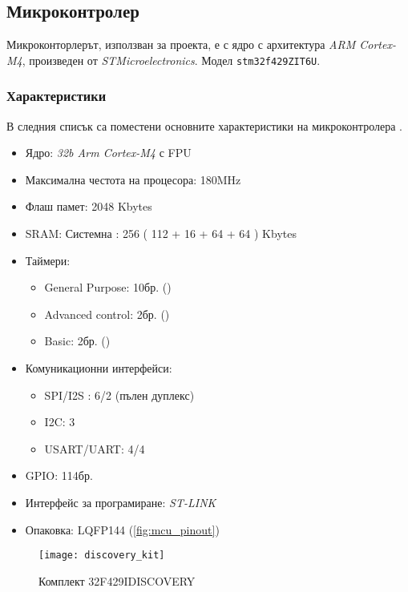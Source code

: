 \subsection{Микроконтролер}
\FloatBarrier

Микроконторлерът, използван за проекта, е с ядро с архитектура \textit{ARM Cortex-M4},
произведен от \textit{STMicroelectronics}.
Модел \texttt{stm32f429ZIT6U}.

\subsubsection{Характеристики}

В следния списък са поместени основните характеристики
на микроконтролера \cite{stmmcudatasheet}.

\begin{itemize} 
    \item Ядро: \textit{32b Arm Cortex-M4} с FPU
    \item Максимална честота на процесора: 180MHz
    \item Флаш памет: 2048 Kbytes
    \item SRAM: Системна : 256 ( 112 + 16 + 64 + 64 ) Kbytes
    \item Таймери:
    \begin{itemize} 
        \item General Purpose: 10бр. ()
        \item Advanced control: 2бр. ()
        \item Basic: 2бр. ()
    \end{itemize}     
    \item Комуникационни интерфейси:
    \begin{itemize}
        \item SPI/I2S : 6/2 (пълен дуплекс) 
        \item I2C: 3
        \item USART/UART: 4/4
    \end{itemize} 
    \item GPIO: 114бр.
    \item Интерфейс за програмиране: \textit{ST-LINK}
    \item Опаковка: LQFP144 (\autoref{fig:mcu_pinout})
\end{itemize}

\begin{figure}[htpb!]
    \centering
    \texttt{[image: discovery\_kit]}
    \caption{Комплект 32F429IDISCOVERY}
    \label{fig:discovery_kit}
\end{figure}

